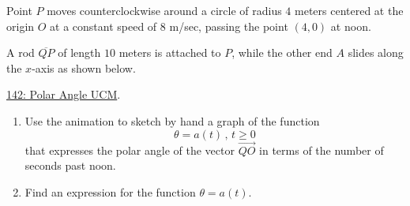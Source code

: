 \documentclass{ximera}
\begin{document}
\begin{question} \label{QOgggERE34rd}

Point $P$ moves counterclockwise around a circle of radius $4$ meters centered at the origin $O$ at a constant speed of $8$ m/sec, passing the point $(4,0)$ at noon.


A rod $\overline{QP}$ of length $10$ meters is attached to $P$, while the other end $A$ slides along the $x$-axis as shown below. 
 
\href{https://www.desmos.com/calculator/jec1aoz1l3}{142: Polar Angle UCM}.

 
\begin{onlineOnly}
    \begin{center}
\end{center}
\end{onlineOnly}


\begin{enumerate}

\item Use the animation to sketch by hand a graph of the function
\[
    \theta = a(t) \, , \, t\geq 0
\]
that expresses the polar angle of the vector $\overrightarrow{QO}$ in terms of the number of seconds past noon.

\item Find an expression for the function $\theta = a(t)$.

\end{enumerate}
\end{question}
\end{document}
